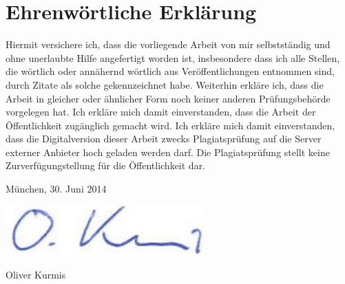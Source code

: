 \newpage

\thispagestyle{empty}

\section*{Ehrenwörtliche Erklärung}  
 
Hiermit  versichere  ich, dass die vorliegende Arbeit von  mir  selbstständig  und 
ohne unerlaubte Hilfe angefertigt worden ist, insbesondere dass ich alle Stellen, 
die wörtlich oder annähernd wörtlich aus Veröffentlichungen entnommen sind, 
durch Zitate als solche gekennzeichnet habe.
Weiterhin erkläre ich, dass die Arbeit in gleicher oder ähnlicher Form noch keiner 
anderen  Prüfungsbehörde  vorgelegen  hat.  Ich  erkläre  mich  damit  einverstanden, 
dass  die  Arbeit  der  Öffentlichkeit  zugänglich  gemacht wird. 
Ich erkläre mich damit einverstanden, dass die Digitalversion dieser 
Arbeit zwecks Plagiatsprüfung auf die Server externer Anbieter hoch geladen 
werden  darf.  Die  Plagiatsprüfung  stellt  keine Zurverfügungstellung  für  die 
Öffentlichkeit dar.
 
München, 30. Juni 2014

\includegraphics[width=.2\textwidth]{img/unterschrift.png}

Oliver Kurmis  